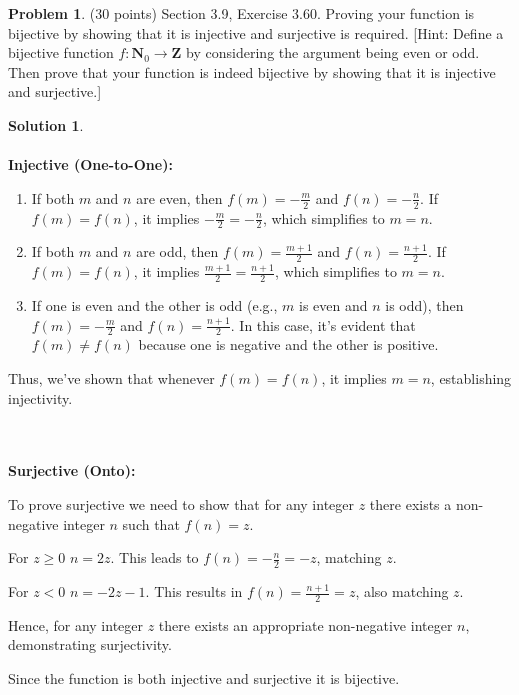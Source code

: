 \documentclass{article}
\theoremstyle{definition}
\newtheorem{problem}{Problem}
\newtheorem*{solution}{Solution}
\newcommand{\N}{\mathbf{N}}
\newcommand{\Z}{\mathbf{Z}}
\begin{document}
\newpage
\begin{problem} (30 points) Section 3.9, Exercise 3.60. Proving your function 
is bijective by showing that it is injective and surjective is required.
[Hint: Define a bijective function $f\colon \N_0\rightarrow \Z$ by
considering the argument being even or odd. Then prove that your 
function is indeed bijective by showing that it is injective and surjective.]
\end{problem}
\begin{solution} 
  ~\\
  ~\\
  \textbf{Injective (One-to-One):}


  
  \begin{enumerate}
      \item If both $m$ and $n$ are even, then $f(m) = -\frac{m}{2}$ and $f(n) = -\frac{n}{2}$. If $f(m) = f(n)$, it implies $-\frac{m}{2} = -\frac{n}{2}$, which simplifies to $m = n$.
      
      \item If both $m$ and $n$ are odd, then $f(m) = \frac{m+1}{2}$ and $f(n) = \frac{n+1}{2}$. If $f(m) = f(n)$, it implies $\frac{m+1}{2} = \frac{n+1}{2}$, which simplifies to $m = n$.
      
      \item If one is even and the other is odd (e.g., $m$ is even and $n$ is odd), then $f(m) = -\frac{m}{2}$ and $f(n) = \frac{n+1}{2}$. In this case, it's evident that $f(m) \neq f(n)$ because one is negative and the other is positive.
  \end{enumerate}
  
  Thus, we've shown that whenever $f(m) = f(n)$, it implies $m = n$, establishing injectivity.
  
  ~\\ 
  ~\\ 
  \textbf{Surjective (Onto):}
  
  To prove surjective we need to show that for any integer $z$ there exists a non-negative integer $n$ such that $f(n) = z$.
  
  For $z \geq 0$ $n = 2z$. This leads to $f(n) = -\frac{n}{2} = -z$, matching $z$.
  
  For $z < 0$  $n = -2z - 1$. This results in $f(n) = \frac{n+1}{2} = z$, also matching $z$.
  
  Hence, for any integer $z$ there exists an appropriate non-negative integer $n$, demonstrating surjectivity.
  
  Since the function is both injective and surjective it is bijective.
  
\end{solution}
\end{document}
